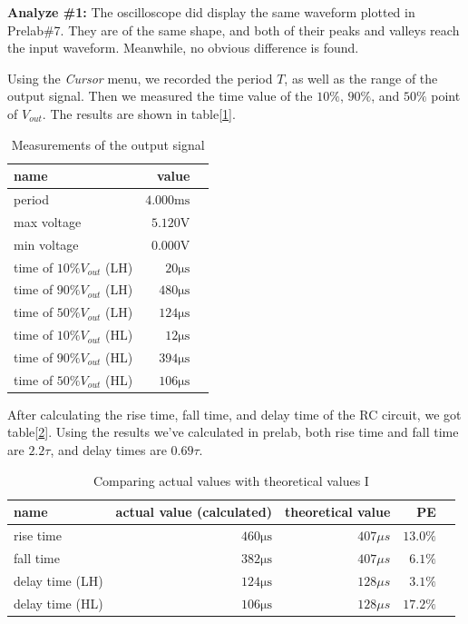 \hfill \newline
\textbf{Analyze \#1:} \newline
\phantom{ } The oscilloscope did display the same waveform plotted in Prelab\#7. They are of the same shape, and both of their peaks and valleys reach the input waveform. Meanwhile, no obvious difference is found. \newline

Using the \textit{Cursor} menu, we recorded the period $T$, as well as the range of the output signal. Then we measured the time value of the $10\%$, $90\%$, and $50\%$ point of $V_{out}$. The results are shown in table[\ref{tab:mea}].

\begin{table}[!htbp]
	\centering
	\caption{Measurements of the output signal}
	\begin{tabular}{lrl}
		\toprule
		name & value & \\
		\midrule
		period & $4.000\mathrm{ms}$ & \\
		max voltage & $5.120\mathrm{V}$ & \\
		min voltage & $0.000\mathrm{V}$ & \\
		time of $10\% V_{out}$ (LH) & $20\mathrm{\mu s}$ & \\
		time of $90\% V_{out}$ (LH) & $480\mathrm{\mu s}$ & \\
		time of $50\% V_{out}$ (LH) & $124\mathrm{\mu s}$ & \\
		time of $10\% V_{out}$ (HL) & $12\mathrm{\mu s}$ & \\
		time of $90\% V_{out}$ (HL) & $394\mathrm{\mu s}$ & \\
		time of $50\% V_{out}$ (HL) & $106\mathrm{\mu s}$ & \\
		\bottomrule
	\end{tabular}
	\label{tab:mea}
\end{table}

\phantom{ } After calculating the rise time, fall time, and delay time of the RC circuit, we got table[\ref{tab:cal}]. Using the results we've calculated in prelab, both rise time and fall time are $2.2\tau$, and delay times are $0.69\tau$.

\begin{table}[!htbp]
	\centering
	\caption{Comparing actual values with theoretical values I}
	\begin{tabular}{lrrrl}
		\toprule
		name & actual value (calculated) & theoretical value & PE & \\
		\midrule
		rise time & $460\mathrm{\mu s}$ & ${407\mu s}$ & $13.0\%$ & \\
		fall time & $382\mathrm{\mu s}$ &  ${407\mu s}$ & $6.1\%$ & \\
		delay time (LH) & $124\mathrm{\mu s}$ & ${128\mu s}$ & $3.1\%$ & \\
		delay time (HL) & $106\mathrm{\mu s}$ &  ${128\mu s}$ & $17.2\%$ & \\
		\bottomrule
	\end{tabular}
	\label{tab:cal}
\end{table}

